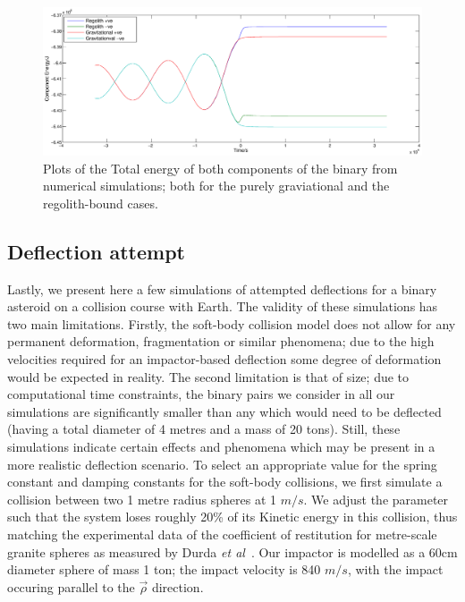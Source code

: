 \documentclass[letterpaper, preprint, paper,11pt]{AAS}	%
\begin{document}
\begin{figure}[H]
\centering
\centerline{\includegraphics[width=1.2\textwidth]{regolith_v_gravitational.eps}} 
\caption{Plots of the Total energy of both components of the binary from numerical simulations; both for the purely graviational and the regolith-bound cases.} 
\label{fig:reg}
\end{figure}

\subsection{Deflection attempt}
Lastly, we present here a few simulations of attempted deflections for a binary asteroid on a collision course with Earth. The validity of these simulations has two main limitations. Firstly, the soft-body collision model does not allow for any permanent deformation, fragmentation or similar phenomena; due to the high velocities required for an impactor-based deflection some degree of deformation would be expected in reality. The second limitation is that of size; due to computational time constraints, the binary pairs we consider in all our simulations are significantly smaller than any which would need to be deflected (having a total diameter of 4 metres and a mass of 20 tons). Still, these simulations indicate certain effects and phenomena which may be present in a more realistic deflection scenario. To select an appropriate value for the spring constant and damping constants for the soft-body collisions, we first simulate a collision between two 1 metre radius spheres at 1 $m/s$. We adjust the parameter such that the system loses roughly 20\% of its Kinetic energy in this collision, thus matching the experimental data of the coefficient of restitution for metre-scale granite spheres as measured by Durda \textit{et al}~\cite{bigrocks}. Our impactor is modelled as a 60cm diameter sphere of mass 1 ton; the impact velocity is 840 $m/s$, with the impact occuring parallel to the $\vec{\rho}$ direction.
\end{document}
